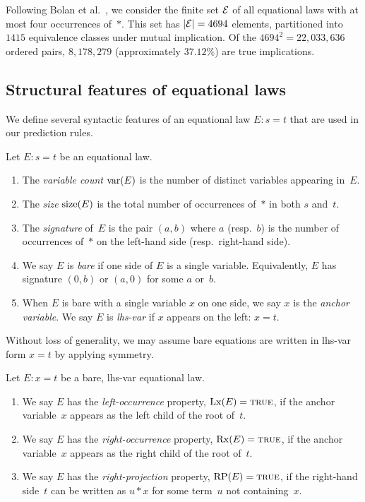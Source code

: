 Following Bolan et al.~\cite{bolan2025equational}, we consider the
finite set $\mathcal{E}$ of all equational laws with at most four occurrences
of~$*$.  This set has $|\mathcal{E}| = 4694$ elements, partitioned into $1415$
equivalence classes under mutual implication.  Of the
$4694^2 = 22{,}033{,}636$ ordered pairs, $8{,}178{,}279$ (approximately
$37.12\%$) are true implications.

\subsection{Structural features of equational laws}\label{subsec:features}

We define several syntactic features of an equational law $E\colon s = t$
that are used in our prediction rules.

\begin{definition}\label{def:structural}
Let $E\colon s = t$ be an equational law.
\begin{enumerate}[label=(\roman*)]
\item The \emph{variable count} $\operatorname{var}(E)$ is the number of distinct
  variables appearing in~$E$.
\item The \emph{size} $\operatorname{size}(E)$ is the total number of occurrences
  of~$*$ in both $s$ and~$t$.
\item The \emph{signature} of~$E$ is the pair $(a,b)$ where $a$
  (resp.~$b$) is the number of occurrences of~$*$ on the left-hand
  side (resp.\ right-hand side).
\item We say $E$ is \emph{bare} if one side of $E$ is a single
  variable.  Equivalently, $E$ has signature $(0, b)$ or $(a, 0)$
  for some $a$ or~$b$.
\item When $E$ is bare with a single variable $x$ on one side, we say
  $x$ is the \emph{anchor variable}.  We say $E$ is \emph{lhs-var}
  if $x$ appears on the left: $x = t$.
\end{enumerate}
\end{definition}

Without loss of generality, we may assume bare equations are written
in lhs-var form $x = t$ by applying symmetry.

\begin{definition}\label{def:projections}
Let $E\colon x = t$ be a bare, lhs-var equational law.
\begin{enumerate}[label=(\roman*)]
\item We say $E$ has the \emph{left-occurrence} property,
  $\operatorname{Lx}(E) = \textsc{true}$, if the anchor variable~$x$ appears
  as the left child of the root of~$t$.
\item We say $E$ has the \emph{right-occurrence} property,
  $\operatorname{Rx}(E) = \textsc{true}$, if the anchor variable~$x$ appears
  as the right child of the root of~$t$.
\item We say $E$ has the \emph{right-projection} property,
  $\operatorname{RP}(E) = \textsc{true}$, if the right-hand side~$t$ can be
  written as $u * x$ for some term~$u$ not containing~$x$.
\end{enumerate}
\end{definition}

